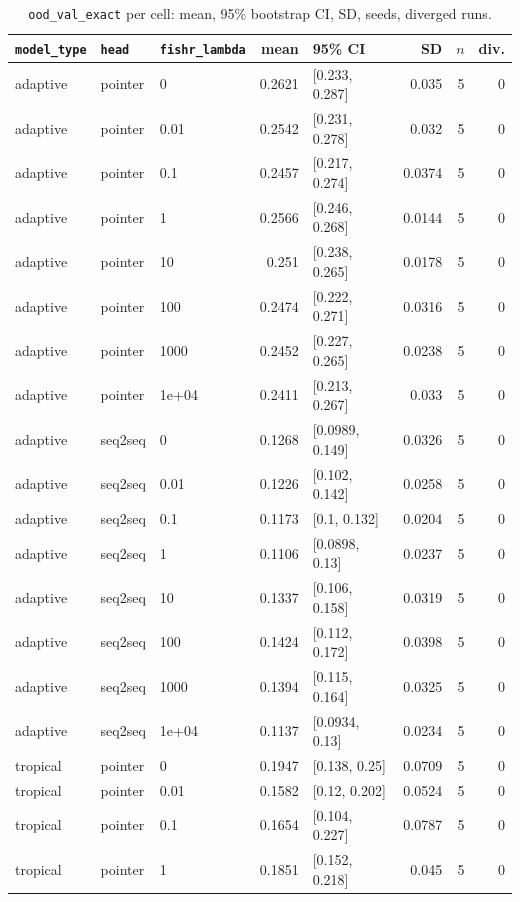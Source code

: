 \documentclass[10pt]{article}
\begin{document}
{\small
\begin{longtable}{lllrlrrr}
\caption{\texttt{ood\_val\_exact} per cell: mean, 95\% bootstrap CI, SD, seeds, diverged runs.}\label{tab:summary-ood_val_exact}\\
\toprule
\texttt{model\_type} & \texttt{head} & \texttt{fishr\_lambda} & mean & 95\% CI & SD & $n$ & div.\\
\midrule
\endhead
adaptive & pointer & 0 & 0.2621 & [0.233, 0.287] & 0.035 & 5 & 0\\
adaptive & pointer & 0.01 & 0.2542 & [0.231, 0.278] & 0.032 & 5 & 0\\
adaptive & pointer & 0.1 & 0.2457 & [0.217, 0.274] & 0.0374 & 5 & 0\\
adaptive & pointer & 1 & 0.2566 & [0.246, 0.268] & 0.0144 & 5 & 0\\
adaptive & pointer & 10 & 0.251 & [0.238, 0.265] & 0.0178 & 5 & 0\\
adaptive & pointer & 100 & 0.2474 & [0.222, 0.271] & 0.0316 & 5 & 0\\
adaptive & pointer & 1000 & 0.2452 & [0.227, 0.265] & 0.0238 & 5 & 0\\
adaptive & pointer & 1e+04 & 0.2411 & [0.213, 0.267] & 0.033 & 5 & 0\\
adaptive & seq2seq & 0 & 0.1268 & [0.0989, 0.149] & 0.0326 & 5 & 0\\
adaptive & seq2seq & 0.01 & 0.1226 & [0.102, 0.142] & 0.0258 & 5 & 0\\
adaptive & seq2seq & 0.1 & 0.1173 & [0.1, 0.132] & 0.0204 & 5 & 0\\
adaptive & seq2seq & 1 & 0.1106 & [0.0898, 0.13] & 0.0237 & 5 & 0\\
adaptive & seq2seq & 10 & 0.1337 & [0.106, 0.158] & 0.0319 & 5 & 0\\
adaptive & seq2seq & 100 & 0.1424 & [0.112, 0.172] & 0.0398 & 5 & 0\\
adaptive & seq2seq & 1000 & 0.1394 & [0.115, 0.164] & 0.0325 & 5 & 0\\
adaptive & seq2seq & 1e+04 & 0.1137 & [0.0934, 0.13] & 0.0234 & 5 & 0\\
tropical & pointer & 0 & 0.1947 & [0.138, 0.25] & 0.0709 & 5 & 0\\
tropical & pointer & 0.01 & 0.1582 & [0.12, 0.202] & 0.0524 & 5 & 0\\
tropical & pointer & 0.1 & 0.1654 & [0.104, 0.227] & 0.0787 & 5 & 0\\
tropical & pointer & 1 & 0.1851 & [0.152, 0.218] & 0.045 & 5 & 0\\

\end{longtable}}
\end{document}
